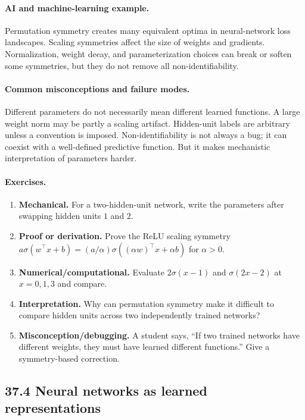 \paragraph{AI and machine-learning example.}
Permutation symmetry creates many equivalent optima in neural-network loss landscapes. Scaling symmetries affect the size of weights and gradients. Normalization, weight decay, and parameterization choices can break or soften some symmetries, but they do not remove all non-identifiability.

\paragraph{Common misconceptions and failure modes.}
Different parameters do not necessarily mean different learned functions. A large weight norm may be partly a scaling artifact. Hidden-unit labels are arbitrary unless a convention is imposed. Non-identifiability is not always a bug; it can coexist with a well-defined predictive function. But it makes mechanistic interpretation of parameters harder.

\paragraph{Exercises.}
\begin{enumerate}[label=\textbf{37.3.\arabic*.}, leftmargin=*]
\item \textbf{Mechanical.} For a two-hidden-unit network, write the parameters after swapping hidden units \(1\) and \(2\).
\item \textbf{Proof or derivation.} Prove the ReLU scaling symmetry \(a\sigma(w^\top x+b)=(a/\alpha)\sigma((\alpha w)^\top x+\alpha b)\) for \(\alpha>0\).
\item \textbf{Numerical/computational.} Evaluate \(2\sigma(x-1)\) and \(\sigma(2x-2)\) at \(x=0,1,3\) and compare.
\item \textbf{Interpretation.} Why can permutation symmetry make it difficult to compare hidden units across two independently trained networks?
\item \textbf{Misconception/debugging.} A student says, ``If two trained networks have different weights, they must have learned different functions.'' Give a symmetry-based correction.
\end{enumerate}

\subsection{37.4 Neural networks as learned representations}

